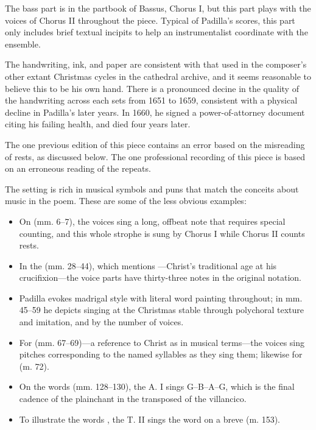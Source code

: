 The bass part is in the partbook of Bassus, Chorus I, but this part plays with 
the voices of Chorus II throughout the piece.
Typical of Padilla's scores, this part only includes brief textual
incipits to help an instrumentalist coordinate with the ensemble.

The handwriting, ink, and paper are consistent with that used in the composer's
other extant Christmas cycles in the cathedral archive, and it seems reasonable
to believe this to be his own hand.
There is a pronounced decine in the quality of the handwriting across each sets
from 1651 to 1659, consistent with a physical decline in Padilla's later
years.
In 1660, he signed a power-of-attorney document citing his failing 
health, and died four years later.%
    \Autocite{Mauleon:PadillaCivil}

The one previous edition of this piece contains an error based on the 
misreading of rests, as discussed below.%
    \Autocite{Padilla:Tello}
The one professional recording of this piece is based on an erroneous reading of
the repeats.%
  \autocite{Padilla:HabanaCD}

The setting is rich in musical symbols and puns that match the conceits about
music in the poem.
These are some of the less obvious examples:
\begin{itemize}
    \item On  (mm. 6--7), the voices sing a long, offbeat note that
        requires special counting, and this whole strophe is sung by Chorus I
        while Chorus II counts rests.
    \item In the  (mm. 28--44), which mentions ---Christ's traditional age at his crucifixion---the voice
        parts have thirty-three notes in the original notation.
    \item Padilla evokes madrigal style with literal word painting throughout; 
        in mm. 45--59 he depicts singing at the Christmas stable  through polychoral texture and imitation, and
         by the number of voices.
    \item For  (mm. 67--69)---a
        reference to Christ as  in musical
        terms---the voices sing pitches corresponding to the named syllables as
        they sing them; likewise for  (m. 72).
    \item On the words  (mm. 128--130), the A. I sings
        G--B\fl--A--G, which is the final cadence of the plainchant  in the transposed  of the villancico.
    \item To illustrate the words , the
        T. II sings the word  on a breve (m. 153).
\end{itemize}

